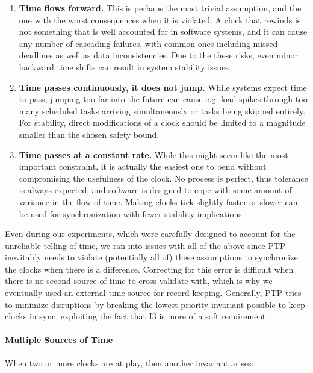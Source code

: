 \begin{enumerate}[label=I\arabic*.]
    \item \textbf{Time flows forward.} This is perhaps the most trivial assumption, and the one with the worst consequences when it is violated. A clock that rewinds is not something that is well accounted for in software systems, and it can cause any number of cascading failures, with common ones including missed deadlines as well as data inconsistencies. Due to the these risks, even minor backward time shifts can result in system stability issues.
    \item \textbf{Time passes continuously, it does not jump.} While systems expect time to pass, jumping too far into the future can cause e.g. load spikes through too many scheduled tasks arriving simultaneously or tasks being skipped entirely. For stability, direct modifications of a clock should be limited to a magnitude smaller than the chosen safety bound.
    \item \textbf{Time passes at a constant rate.} While this might seem like the most important constraint, it is actually the easiest one to bend without compromising the usefulness of the clock. No process is perfect, thus tolerance is always expected, and software is designed to cope with some amount of variance in the flow of time. Making clocks tick slightly faster or slower can be used for synchronization with fewer stability implications.
    \setcounter{errorConditions}{\value{enumi}}
\end{enumerate}

Even during our experiments, which were carefully designed to account for the unreliable telling of time, we ran into issues with all of the above since PTP inevitably needs to violate (potentially all of) these assumptions to synchronize the clocks when there is a difference. Correcting for this error is difficult when there is no second source of time to cross-validate with, which is why we eventually used an external time source for record-keeping. Generally, PTP tries to minimize disruptions by breaking the lowest priority invariant possible to keep clocks in sync, exploiting the fact that I3 is more of a soft requirement.

\paragraph*{Multiple Sources of Time}

When two or more clocks are at play, then another invariant arises:

